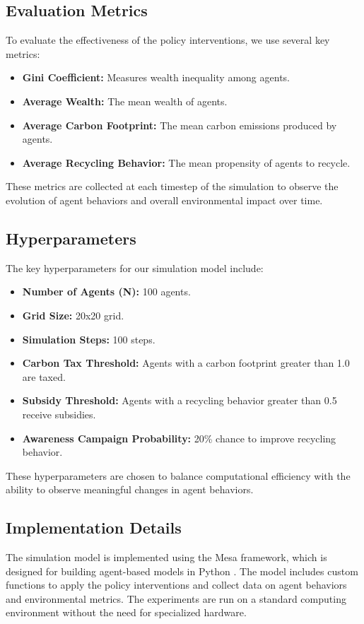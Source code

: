 \documentclass{article} %
\begin{document}
\subsection{Evaluation Metrics}
To evaluate the effectiveness of the policy interventions, we use several key metrics:
\begin{itemize}
    \item \textbf{Gini Coefficient:} Measures wealth inequality among agents.
    \item \textbf{Average Wealth:} The mean wealth of agents.
    \item \textbf{Average Carbon Footprint:} The mean carbon emissions produced by agents.
    \item \textbf{Average Recycling Behavior:} The mean propensity of agents to recycle.
\end{itemize}
These metrics are collected at each timestep of the simulation to observe the evolution of agent behaviors and overall environmental impact over time.

\subsection{Hyperparameters}
The key hyperparameters for our simulation model include:
\begin{itemize}
    \item \textbf{Number of Agents (N):} 100 agents.
    \item \textbf{Grid Size:} 20x20 grid.
    \item \textbf{Simulation Steps:} 100 steps.
    \item \textbf{Carbon Tax Threshold:} Agents with a carbon footprint greater than 1.0 are taxed.
    \item \textbf{Subsidy Threshold:} Agents with a recycling behavior greater than 0.5 receive subsidies.
    \item \textbf{Awareness Campaign Probability:} 20\% chance to improve recycling behavior.
\end{itemize}
These hyperparameters are chosen to balance computational efficiency with the ability to observe meaningful changes in agent behaviors.

\subsection{Implementation Details}
The simulation model is implemented using the Mesa framework, which is designed for building agent-based models in Python \citep{poledna2023economic}. The model includes custom functions to apply the policy interventions and collect data on agent behaviors and environmental metrics. The experiments are run on a standard computing environment without the need for specialized hardware.
\end{document}
